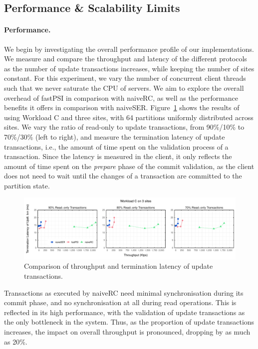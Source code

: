 \subsection{Performance \& Scalability Limits}

\paragraph{Performance.} We begin by investigating the overall performance profile of our implementations. We measure and compare the throughput and latency of the different protocols as the number of update transactions increases, while keeping the number of sites constant. For this experiment, we vary the number of concurrent client threads such that we never saturate the CPU of servers. We aim to explore the overall overhead of fastPSI in comparison with naiveRC, as well as the performance benefits it offers in comparison with naiveSER. Figure~\ref{fig:general_bench} shows the results of using Workload C and three sites, with 64 partitions uniformly distributed across sites. We vary the ratio of read-only to update transactions, from 90\%/10\% to 70\%/30\% (left to right), and measure the termination latency of update transactions, i.e., the amount of time spent on the validation process of a transaction. Since the latency is measured in the client, it only reflects the amount of time spent on the \emph{prepare} phase of the commit validation, as the client does not need to wait until the changes of a transaction are committed to the partition state.

\begin{figure}[t]
\vspace{-0.5cm}
\includegraphics[width=\textwidth]{figures/general_bench.pdf}
\vspace{-1cm}
\caption{Comparison of throughput and termination latency of update transactions. }
\label{fig:general_bench}
\end{figure}

Transactions as executed by naiveRC need minimal synchronisation during its commit phase, and no synchronisation at all during read operations. This is reflected in its high performance, with the validation of update transactions as the only bottleneck in the system. Thus, as the proportion of update transactions increases, the impact on overall throughput is pronounced, dropping by as much as 20\%.

